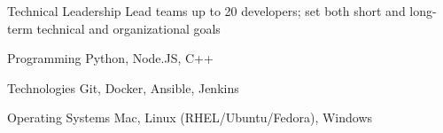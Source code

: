 
\begin{cvskills}

  \cvskill
    {Technical Leadership} %
    {Lead teams up to 20 developers; set both short and long-term technical and organizational goals} %

  \cvskill
    {Programming} %
    {Python, Node.JS, C++} %

  \cvskill
    {Technologies} %
    {Git, Docker, Ansible, Jenkins} %

  \cvskill
    {Operating Systems} %
    {Mac, Linux (RHEL/Ubuntu/Fedora), Windows} %

\end{cvskills}